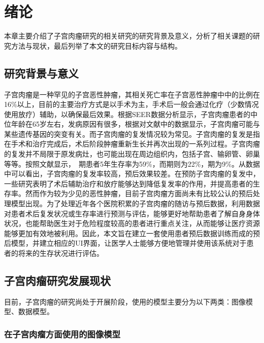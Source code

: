 \chapter{绪论}
\label{cha:intro}

本章主要介绍了子宫肉瘤研究的相关研究的研究背景及意义，分析了相关课题的研究方法与现状，最后列举了本文的研究目标内容与结构。

\section{研究背景与意义}

子宫肉瘤是一种罕见的子宫恶性肿瘤，其相关死亡率在子宫恶性肿瘤中中的比例在16\%以上\cite{commonView}，目前的主要治疗方式是以手术为主，手术后一般会通过化疗（少数情况使用放疗）辅助，以确保最后效果。根据SEER数据分析显示，子宫肉瘤患者的中位年龄在65岁左右，发病原因有很多，根据对文献中的数据显示，子宫肉瘤可能与某些遗传基因的突变有关。而子宫肉瘤的复发情况较为常见。子宫肉瘤的复发是指在手术和治疗完成后，术后阶段肿瘤重新生长并再次出现的一系列过程。子宫肉瘤的复发并不局限于原发病灶，也可能出现在周边组织内，包括子宫、输卵管、卵巢等等。按照文献显示，\uppercase\expandafter{}~\uppercase\expandafter{}期患者5年生存率为59\%，而\uppercase\expandafter{}期则为22\%，\uppercase\expandafter{}期为9\%。\cite{commonView}从数据中可以看出，子宫肉瘤的复发率较高，预后效果较差。在预防子宫肉瘤的复发中，一些研究表明了术后辅助治疗和放疗能够达到降低复发率的作用，并提高患者的生存率。然而作为较为少见的恶性肿瘤，目前子宫肉瘤方面尚未有比较公认的预后处理模型出现。为了处理近年各个医院积累的子宫肉瘤的随访与预后数据，利用数据对患者术后复发状况或生存率进行预测与评估，能够更好地帮助患者了解自身身体状况，也能帮助医生对于危险程度较高的患者进行重点关注，从而能够让医疗资源能够更加有效地被利用。因此，本文旨在建立一套使用患者预后数据训练而成的预后模型，并建立相应的UI界面，让医学人士能够方便地管理并使用该系统对于患者的将来的生存状况进行评估。

\section{子宫肉瘤研究发展现状}

目前，子宫肉瘤的研究尚处于开展阶段，使用的模型主要分为以下两类：图像模型、数据模型。

\subsection{在子宫肉瘤方面使用的图像模型}

